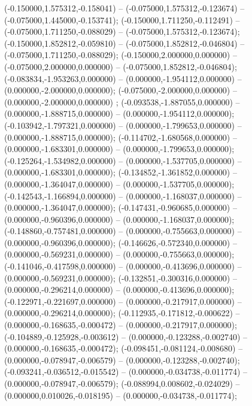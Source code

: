  (-0.150000,1.575312,-0.158041) -- (-0.075000,1.575312,-0.123674) -- (-0.075000,1.445000,-0.153741);
 (-0.150000,1.711250,-0.112491) -- (-0.075000,1.711250,-0.088029) -- (-0.075000,1.575312,-0.123674);
 (-0.150000,1.852812,-0.059810) -- (-0.075000,1.852812,-0.046804) -- (-0.075000,1.711250,-0.088029);
 (-0.150000,2.000000,0.000000) -- (-0.075000,2.000000,0.000000) -- (-0.075000,1.852812,-0.046804);
 (-0.083834,-1.953263,0.000000) -- (0.000000,-1.954112,0.000000) -- (0.000000,-2.000000,0.000000);
 (-0.075000,-2.000000,0.000000) -- (0.000000,-2.000000,0.000000) ;
 (-0.093538,-1.887055,0.000000) -- (0.000000,-1.888715,0.000000) -- (0.000000,-1.954112,0.000000);
 (-0.103942,-1.797321,0.000000) -- (0.000000,-1.799653,0.000000) -- (0.000000,-1.888715,0.000000);
 (-0.114702,-1.680568,0.000000) -- (0.000000,-1.683301,0.000000) -- (0.000000,-1.799653,0.000000);
 (-0.125264,-1.534982,0.000000) -- (0.000000,-1.537705,0.000000) -- (0.000000,-1.683301,0.000000);
 (-0.134852,-1.361852,0.000000) -- (0.000000,-1.364047,0.000000) -- (0.000000,-1.537705,0.000000);
 (-0.142543,-1.166894,0.000000) -- (0.000000,-1.168037,0.000000) -- (0.000000,-1.364047,0.000000);
 (-0.147431,-0.960685,0.000000) -- (0.000000,-0.960396,0.000000) -- (0.000000,-1.168037,0.000000);
 (-0.148860,-0.757481,0.000000) -- (0.000000,-0.755663,0.000000) -- (0.000000,-0.960396,0.000000);
 (-0.146626,-0.572340,0.000000) -- (0.000000,-0.569231,0.000000) -- (0.000000,-0.755663,0.000000);
 (-0.141046,-0.417598,0.000000) -- (0.000000,-0.413696,0.000000) -- (0.000000,-0.569231,0.000000);
 (-0.132851,-0.300316,0.000000) -- (0.000000,-0.296214,0.000000) -- (0.000000,-0.413696,0.000000);
 (-0.122971,-0.221697,0.000000) -- (0.000000,-0.217917,0.000000) -- (0.000000,-0.296214,0.000000);
 (-0.112935,-0.171812,-0.000622) -- (0.000000,-0.168635,-0.000472) -- (0.000000,-0.217917,0.000000);
 (-0.104889,-0.125928,-0.003612) -- (0.000000,-0.123288,-0.002740) -- (0.000000,-0.168635,-0.000472);
 (-0.098451,-0.081124,-0.008680) -- (0.000000,-0.078947,-0.006579) -- (0.000000,-0.123288,-0.002740);
 (-0.093241,-0.036512,-0.015542) -- (0.000000,-0.034738,-0.011774) -- (0.000000,-0.078947,-0.006579);
 (-0.088994,0.008602,-0.024029) -- (0.000000,0.010026,-0.018195) -- (0.000000,-0.034738,-0.011774);
